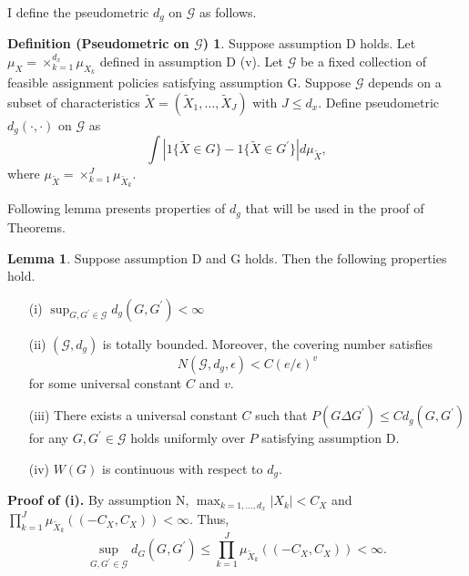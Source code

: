 \documentclass[12pt,oneside,reqno,english]{amsart}
\theoremstyle{definition}
\newtheorem{lemma}{Lemma}
\newtheorem*{defP}{Definition (Pseudometric on $\mathcal{G}$)}
\begin{document}
I define the pseudometric $d_{g}$ on $\mathcal{G}$ as follows. 
\begin{defP}
Suppose assumption D holds. Let $\mu_{X}=\times_{k=1}^{d_{x}}\mu_{X_{k}}$ defined in assumption D (v).  
Let $\mathcal{G}$ be a fixed collection of feasible assignment policies satisfying assumption G. 
Suppose $\mathcal{G}$ depends on a subset of characteristics $\tilde{X}=(\tilde{X}_{1},\ldots,\tilde{X}_{J})$ with $J\leq d_{x}$. 
Define pseudometric $d_{g}(\cdot,\cdot)$ on $\mathcal{G}$ as 
\[\int |1\{\tilde{X}\in G\}-1\{\tilde{X}\in G^{\prime}\}| d\mu_{\tilde{X}},\]
where $\mu_{\tilde{X}}=\times_{k=1}^{J}\mu_{\tilde{X}_{k}}$. 
\end{defP} 
Following lemma presents properties of $d_{g}$ that will be used in the proof of Theorems. 
\begin{lemma}\label{l:metric}
Suppose assumption D and G holds. Then the following properties hold. 
\begin{itemize}
\item[{(i)}] $\sup_{G,G^{\prime}\in \mathcal{G}}d_{g}(G,G^{\prime})<\infty$

\item[{(ii)}] $(\mathcal{G},d_{g})$ is totally bounded. Moreover, the covering number satisfies 
\[N(\mathcal{G},d_{g},\epsilon)<C(e/\epsilon)^{v}\]
for some universal constant $C$ and $v$.

\item[{(iii)}] There exists a universal constant $C$ such that $P(G\Delta G^{\prime}) \leq Cd_{g}(G, G^{\prime})$ for any $G,G^{\prime}\in \mathcal{G}$ 
holds uniformly over $P$ satisfying assumption D.

\item[{(iv)}] $W(G)$ is continuous with respect to $d_{g}$.

\end{itemize}
\end{lemma}
\textbf{Proof of (i).}
By assumption N, $\max_{k=1,\ldots,d_{x}}|X_{k}|<C_{X}$ and $\prod_{k=1}^{J}\mu_{\tilde{X}_{k}}((-C_{X},C_{X}))<\infty$.
 Thus,   
\[\sup_{G,G^{\prime}\in \mathcal{G}}d_{G}(G,G^{\prime})\leq \prod_{k=1}^{J}\mu_{\tilde{X}_{k}}((-C_{X},C_{X}))<\infty.\]
\end{document}
